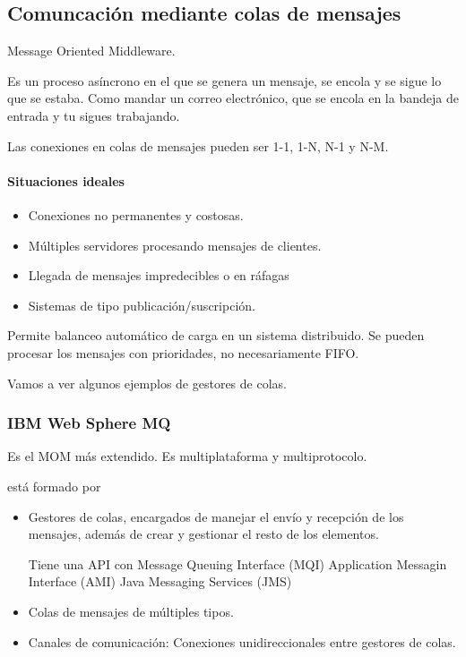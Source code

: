 \subsection{Comuncación mediante colas de mensajes}

\begin{defn}[MOM]
Message Oriented Middleware.

Es un proceso asíncrono en el que se genera un mensaje, se encola y se sigue lo que se estaba. Como mandar un correo electrónico, que se encola en la bandeja de entrada y tu sigues trabajando.
\end{defn}

Las conexiones en colas de mensajes pueden ser 1-1, 1-N, N-1 y N-M.

\paragraph{Situaciones ideales}
\begin{itemize}
 	\item Conexiones no permanentes y costosas.
 	\item Múltiples servidores procesando mensajes de clientes.
 	\item Llegada de mensajes impredecibles o en ráfagas
 	\item Sistemas de tipo publicación/suscripción.
 \end{itemize}
 \obs Permite balanceo automático de carga en un sistema distribuido. Se pueden procesar los mensajes con prioridades, no necesariamente FIFO.

Vamos a ver algunos ejemplos de gestores de colas.
\subsubsection{IBM Web Sphere MQ}
Es el MOM más extendido. Es multiplataforma y multiprotocolo.


 está formado por
\begin{itemize}
	\item Gestores de colas, encargados de manejar el envío y recepción de los mensajes, además de crear y gestionar el resto de los elementos.

	Tiene una API con
	\subitem Message Queuing Interface (MQI)
	\subitem Application Messagin Interface (AMI)
	\subitem Java Messaging Services (JMS)
	\item Colas de mensajes de múltiples tipos.
	\item Canales de comunicación: Conexiones unidireccionales entre gestores de colas.
\end{itemize}

